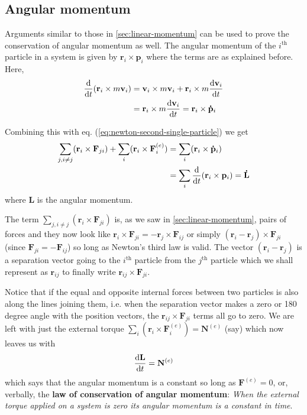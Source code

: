 \documentclass[english,seminar,headertitle]{lecture}
\begin{document}
\subsection{Angular momentum}
%
Arguments similar to those in \ref{sec:linear-momentum} can be used to prove the conservation of angular momentum as well. The angular momentum of the $i^\textrm{th}$ particle in a system is given by $\mathbf{r}_i \times \mathbf{p}_i$ where the terms are as explained before. Here,
\begin{align*}
{\textrm{d}\over\textrm{d}t} (\mathbf{r}_i \times m\mathbf{v}_i)
&= \mathbf{v}_i \times m\mathbf{v}_i + \mathbf{r}_i \times m{\textrm{d}\mathbf{v}_i\over\textrm{d}t} \\
&= \mathbf{r}_i \times m{\textrm{d}\mathbf{v}_i\over\textrm{d}t} = \mathbf{r}_i \times \mathbf{\dot{p}}_i
\end{align*}

Combining this with eq. (\ref{eq:newton-second-single-particle}) we get
\begin{align*}
	\sum_{j,i\neq j} (\mathbf{r}_i \times  \mathbf{F}_{ji}) + \sum_i (\mathbf{r}_i \times \mathbf{F}_i^{(e)}) &= \sum_i (\mathbf{r}_i \times \mathbf{\dot{p}}_i) \\
	&= \sum_i {\textrm{d}\over\textrm{d}t} (\mathbf{r}_i \times \mathbf{p}_i) = \mathbf{\dot{L}}
\end{align*}
where $\mathbf{L}$ is the angular momentum.

The term $\sum_{j,i\neq j} (\mathbf{r}_i \times  \mathbf{F}_{ji})$ is, as we saw in \ref{sec:linear-momentum}, pairs of forces and they now look like $\mathbf{r}_i \times \mathbf{F}_{ji} = - \mathbf{r}_j \times \mathbf{F}_{ij}$ or simply $(\mathbf{r}_i - \mathbf{r}_j) \times \mathbf{F}_{ji}$ (since $\mathbf{F}_{ji} = -\mathbf{F}_{ij}$) so long as Newton's third law is valid. The vector $(\mathbf{r}_i - \mathbf{r}_j)$ is a separation vector going to the $i^\textrm{th}$ particle from the $j^\textrm{th}$ particle which we shall represent as $\mathbf{r}_{ij}$ to finally write $\mathbf{r}_{ij} \times \mathbf{F}_{ji}$.

Notice that if the equal and opposite internal forces between two particles is also along the lines joining them, i.e. when the separation vector makes a zero or 180 degree angle with the position vectors, the $\mathbf{r}_{ij} \times \mathbf{F}_{ji}$ terms all go to zero. We are left with just the external torque $\sum_i (\mathbf{r}_i \times \mathbf{F}_i^{(e)}) = \mathbf{N}^{(e)}$ (say) which now leaves us with
\begin{equation}
{\textrm{d}\mathbf{L}\over\textrm{d}t} = \mathbf{N}^{(e)} \label{eq:L-conservation}
\end{equation}%
which says that the angular momentum is a constant so long as $\mathbf{F}^{(e)} = 0$, or, verbally, the \textbf{law of conservation of angular momentum}: \textit{When the external torque applied on a system is zero its angular momentum is a constant in time}.
\end{document}
